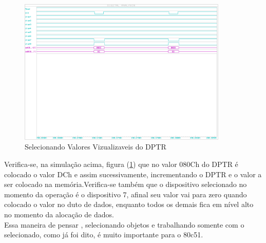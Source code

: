 \documentclass{Fabiano_file}
\begin{document}
\begin{figure}[h!]
\centering
\includegraphics[width=0.89\textwidth]{ram_e_rom_duto_conteudo.pdf}
\caption{Selecionando Valores Vizualizaveis do DPTR}
\label{fig:ram_e_rom_duto_conteudo}
\end{figure}

\newpage

Verifica-se, na simulação acima, figura (\ref{fig:ram_e_rom_duto_conteudo}) que no valor 080Ch do DPTR é colocado o valor DCh e assim sucessivamente, incrementando
o DPTR e o valor a ser colocado na memória.Verifica-se também que o dispositivo selecionado no momento da operação é o dispositivo 7, afinal seu valor vai para
zero quando colocado o valor no duto de dados, enquanto todos os demais fica em nível alto no momento da alocação de dados.\\
Essa maneira de pensar , selecionando objetos e trabalhando somente com o selecionado, como já foi dito, é muito importante para o 80c51.\\

\pagebreak
\end{document}
